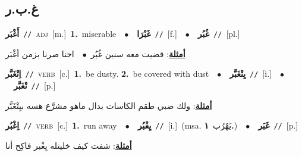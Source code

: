 \documentclass[10pt,a4paper,twoside]{article} %
\begin{document}
\begin{multicols}{2}
{\vspace{-3mm}
\subsection*{\color{blue}\foreignlanguage{arabic}{غ.ب.ر}\color{blue}{}} 

{\setlength\topsep{0pt}\textbf{\foreignlanguage{arabic}{أَغْبَر}}\ {\color{gray}\texttt{//}\color{black}}\ \textsc{adj}\ [m.]\ \textbf{1.}~miserable\ \ $\bullet$\ \ \setlength\topsep{0pt}\textbf{\foreignlanguage{arabic}{غَبْرَا}}\ {\color{gray}\texttt{//}\color{black}}\ [f.]\ \ $\bullet$\ \ \setlength\topsep{0pt}\textbf{\foreignlanguage{arabic}{غُبُر}}\ {\color{gray}\texttt{//}\color{black}}\ [pl.]\  \begin{flushright}\color{gray}\foreignlanguage{arabic}{\textbf{\underline{\foreignlanguage{arabic}{أمثلة}}}: قضيت معه سنين غُبُر\ $\bullet$\ \  احنا صرنا بزمن أغْبَر}\end{flushright}\color{black}} \vspace{2mm}

{\setlength\topsep{0pt}\textbf{\foreignlanguage{arabic}{اِتْغَبَّر}}\ {\color{gray}\texttt{//}\color{black}}\ \textsc{verb}\ [c.]\ \textbf{1.}~be dusty.  \textbf{2.}~be covered with dust\ \ $\bullet$\ \ \setlength\topsep{0pt}\textbf{\foreignlanguage{arabic}{يِتْغَبَّر}}\ {\color{gray}\texttt{//}\color{black}}\ [i.]\ \ $\bullet$\ \ \setlength\topsep{0pt}\textbf{\foreignlanguage{arabic}{تْغَبَّر}}\ {\color{gray}\texttt{//}\color{black}}\ [p.]\  \begin{flushright}\color{gray}\foreignlanguage{arabic}{\textbf{\underline{\foreignlanguage{arabic}{أمثلة}}}: ولك ضبي طقم الكاسات بدال ماهو مشرَّع هسه بيِتْغَبَّر}\end{flushright}\color{black}} \vspace{2mm}

{\setlength\topsep{0pt}\textbf{\foreignlanguage{arabic}{اِغْبُر}}\ {\color{gray}\texttt{//}\color{black}}\ \textsc{verb}\ [c.]\ \textbf{1.}~run away\ \ $\bullet$\ \ \setlength\topsep{0pt}\textbf{\foreignlanguage{arabic}{يِغْبُر}}\ {\color{gray}\texttt{//}\color{black}}\ [i.]\ \color{gray}(msa. \foreignlanguage{arabic}{يَهْرُب}~\foreignlanguage{arabic}{\textbf{١.}})\color{black}\ \ $\bullet$\ \ \setlength\topsep{0pt}\textbf{\foreignlanguage{arabic}{غَبَر}}\ {\color{gray}\texttt{//}\color{black}}\ [p.]\  \begin{flushright}\color{gray}\foreignlanguage{arabic}{\textbf{\underline{\foreignlanguage{arabic}{أمثلة}}}: شفت كيف خليتله يِغْبر فاكِح أنا}\end{flushright}\color{black}} \vspace{2mm}

}
\end{multicols}
\end{document}
